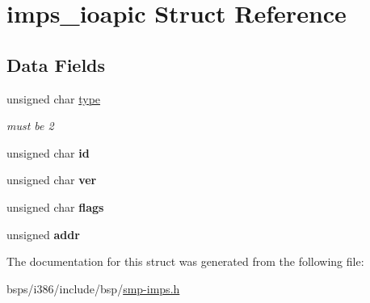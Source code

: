 \hypertarget{structimps__ioapic}{}\section{imps\+\_\+ioapic Struct Reference}
\label{structimps__ioapic}
\subsection*{Data Fields}
\begin{DoxyCompactItemize}
\item 
\mbox{\label{structimps__ioapic_a7dd6ab7e6a3f28712b589982ca7b1810}} 
unsigned char \mbox{\hyperlink{structimps__ioapic_a7dd6ab7e6a3f28712b589982ca7b1810}{type}}
\begin{DoxyCompactList}\small\item\em must be 2 \end{DoxyCompactList}\item 
\mbox{\label{structimps__ioapic_a22030c82e2c04d3c067e8c7f4254c150}} 
unsigned char {\bfseries id}
\item 
\mbox{\label{structimps__ioapic_a39be95bd64e80438a1951ea8c87f0792}} 
unsigned char {\bfseries ver}
\item 
\mbox{\label{structimps__ioapic_ad7d350582c8b05213f05d5357e563909}} 
unsigned char {\bfseries flags}
\item 
\mbox{\label{structimps__ioapic_a3467275b9cf002647e218cd5ebe0515f}} 
unsigned {\bfseries addr}
\end{DoxyCompactItemize}


The documentation for this struct was generated from the following file\+:\begin{DoxyCompactItemize}
\item 
bsps/i386/include/bsp/\mbox{\hyperlink{smp-imps_8h}{smp-\/imps.\+h}}\end{DoxyCompactItemize}

